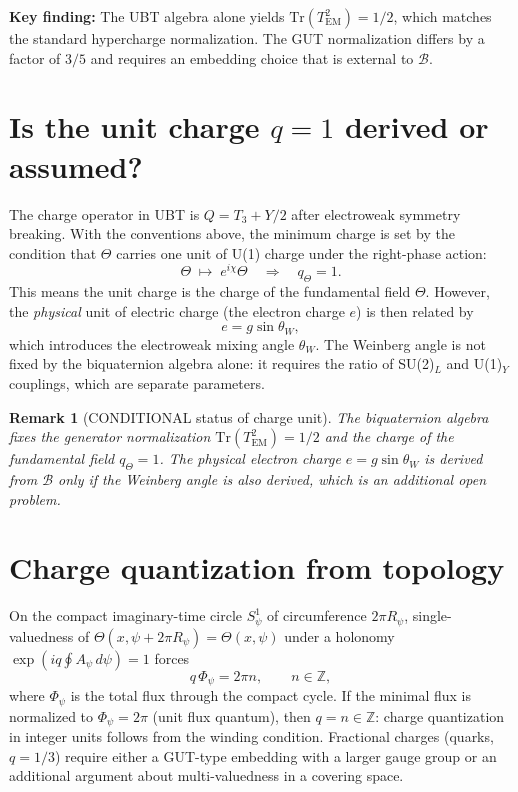 \documentclass[11pt,a4paper]{article}
\newtheorem{remark}[proposition]{Remark}
\begin{document}
\textbf{Key finding:} The UBT algebra alone yields
$\mathrm{Tr}(T_{\mathrm{EM}}^2)=1/2$, which matches the standard hypercharge
normalization.  The GUT normalization differs by a factor of $3/5$ and requires
an embedding choice that is external to $\mathcal{B}$.

\section{Is the unit charge $q=1$ derived or assumed?}

The charge operator in UBT is $Q=T_3+Y/2$ after electroweak symmetry breaking.
With the conventions above, the minimum charge is set by the condition that
$\Theta$ carries one unit of U(1) charge under the right-phase action:
\begin{equation}
  \Theta\;\longmapsto\; e^{i\chi}\Theta
  \quad\Rightarrow\quad q_\Theta = 1.
\end{equation}
This means the unit charge is the charge of the fundamental field $\Theta$.
However, the \emph{physical} unit of electric charge (the electron charge $e$)
is then related by
\begin{equation}
  e = g\sin\theta_W,
\end{equation}
which introduces the electroweak mixing angle $\theta_W$.
The Weinberg angle is not fixed by the biquaternion algebra alone: it requires
the ratio of SU(2)$_L$ and U(1)$_Y$ couplings, which are separate parameters.

\begin{remark}[CONDITIONAL status of charge unit]
The biquaternion algebra fixes the \emph{generator normalization}
$\mathrm{Tr}(T_{\mathrm{EM}}^2)=1/2$ and the charge of the fundamental field
$q_\Theta=1$.  The physical electron charge $e=g\sin\theta_W$ is derived from
$\mathcal{B}$ only if the Weinberg angle is also derived, which is an additional
open problem.
\end{remark}

\section{Charge quantization from topology}

On the compact imaginary-time circle $S^1_\psi$ of circumference $2\pi R_\psi$,
single-valuedness of $\Theta(x,\psi+2\pi R_\psi)=\Theta(x,\psi)$ under a
holonomy $\exp(iq\oint A_\psi\,d\psi)=1$ forces
\begin{equation}
  q\,\Phi_\psi = 2\pi n,\qquad n\in\mathbb{Z},
\end{equation}
where $\Phi_\psi$ is the total flux through the compact cycle.
If the minimal flux is normalized to $\Phi_\psi=2\pi$ (unit flux quantum),
then $q=n\in\mathbb{Z}$: charge quantization in integer units follows from the
winding condition.  Fractional charges (quarks, $q=1/3$) require either
a GUT-type embedding with a larger gauge group or an additional argument about
multi-valuedness in a covering space.
\end{document}
